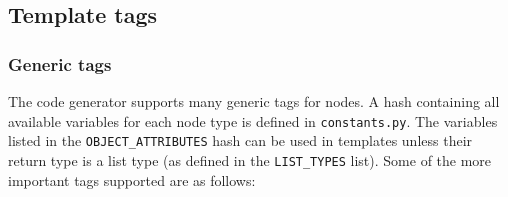 \subsection{Template tags}
\label{subsection-template-tags}

\subsubsection{Generic tags}

The code generator supports many generic tags for nodes. A hash containing all
available variables for each node type is defined in {\tt constants.py}. The
variables listed in the {\tt OBJECT\_ATTRIBUTES} hash can be used in templates
unless their return type is a list type (as defined in the {\tt LIST\_TYPES}
list). Some of the more important tags supported are as follows:

